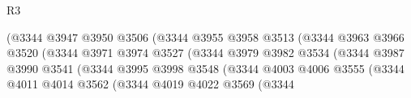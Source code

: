 \begin{lexlean}{R3}
\begin{coremodule}
                                                (@3344
                                                  @3947
                                                  @3950
                                                  @3506
                                                  (@3344
                                                    @3955
                                                    @3958
                                                    @3513
                                                    (@3344
                                                      @3963
                                                      @3966
                                                      @3520
                                                      (@3344
                                                        @3971
                                                        @3974
                                                        @3527
                                                        (@3344
                                                          @3979
                                                          @3982
                                                          @3534
                                                          (@3344
                                                            @3987
                                                            @3990
                                                            @3541
                                                            (@3344
                                                              @3995
                                                              @3998
                                                              @3548
                                                              (@3344
                                                                @4003
                                                                @4006
                                                                @3555
                                                                (@3344
                                                                  @4011
                                                                  @4014
                                                                  @3562
                                                                  (@3344
                                                                    @4019
                                                                    @4022
                                                                    @3569
                                                                    (@3344

\end{coremodule}
\end{lexlean}
